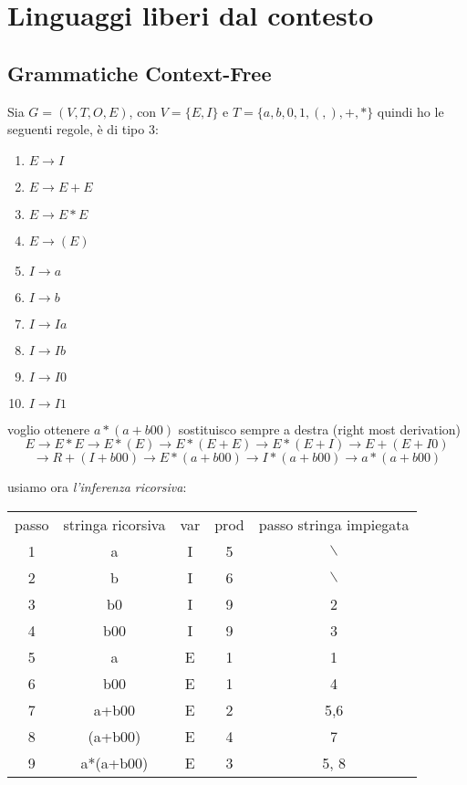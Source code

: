 \setchapterpreamble[u]{\margintoc}
\chapter{Linguaggi liberi dal contesto}\label{cha:CFG}







\section{Grammatiche Context-Free}\label{sec:CFG}

\begin{example}
	Sia $G=(V,T,O,E)$, con $V=\{E,I\}$ e $T=\{a,b,0,1,(,),+,*\}$
	quindi ho le seguenti regole, è di tipo 3:
	\begin{enumerate}
		\item $E\to I$
		\item $E\to E+E$
		\item $E\to E*E$
		\item $E\to (E)$
		\item $I\to a$
		\item $I\to b$
		\item $I\to Ia$
		\item $I\to Ib$
		\item $I\to I0$
		\item $I\to I1$
	\end{enumerate}
	voglio ottenere $a*(a+b00)$
	sostituisco sempre a destra (right most derivation)
	$$E\to E*E\to E*(E)\to E*(E+E)\to E*(E+I)\to E+(E+I0)$$
	$$\to R+(I+b00)\to E*(a+b00)\to I*(a+b00)\to a*(a+b00)$$

	usiamo ora \textit{l'inferenza ricorsiva}:
	\begin{center}
		\begin{tabular}{|c|c|c|c|c|}
			\hline
			passo & stringa ricorsiva & var & prod & passo stringa impiegata \\
			1     & a                 & I   & 5    & $\backslash$            \\
			\hline
			2     & b                 & I   & 6    & $\backslash$            \\
			\hline
			3     & b0                & I   & 9    & 2                       \\
			\hline
			4     & b00               & I   & 9    & 3                       \\
			\hline
			5     & a                 & E   & 1    & 1                       \\
			\hline
			6     & b00               & E   & 1    & 4                       \\
			\hline
			7     & a+b00             & E   & 2    & 5,6                     \\
			\hline
			8     & (a+b00)           & E   & 4    & 7                       \\
			\hline
			9     & a*(a+b00)         & E   & 3    & 5, 8                    \\
			\hline
		\end{tabular}
	\end{center}
\end{example}
